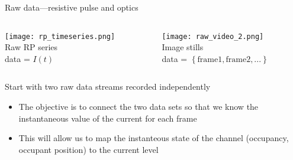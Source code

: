 \begin{frame}[c]{Raw data---resistive pulse and optics}


	\begin{columns}[t]
		\begin{column}[T]{2.25in}
			{\centering 
				\texttt{[image: rp\_timeseries.png]} \\
				Raw RP series \\
				data = $I\left(t\right)$ \\
				\par
			}
		\end{column}
		
		
		\begin{column}[T]{2.25in}
			{\centering 
				\texttt{[image: raw\_video\_2.png]} \\
				Image stills \\
				data = $\left\{\mathrm{frame1, frame2, ...}\right\}$
				\par
			}
		\end{column}
	\end{columns}
	\vspace{.2in}
	
	Start with two raw data streams recorded independently \\
		
	\begin{itemize}
		\item The objective is to connect the two data sets so that we know the instantaneous value of the current for each frame
		\item This will allow us to map the instanteous state of the channel (occupancy, occupant position) to the current level
	\end{itemize}



\end{frame}




